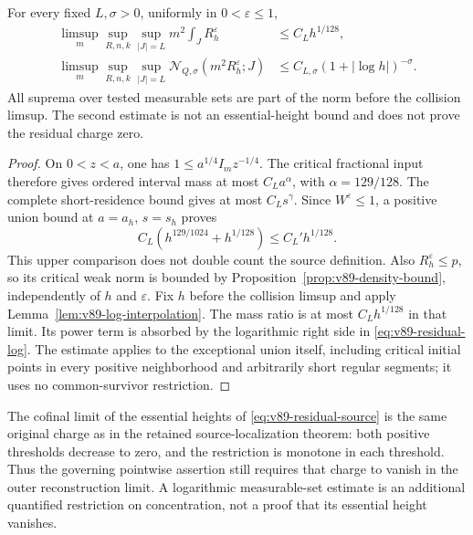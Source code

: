 \begin{theorem}
\label{thm:v89-exceptional-log}
For every fixed $L,\sigma>0$, uniformly in $0<\varepsilon\le1$,
\begin{align}
 \limsup_m\sup_{R,n,k}\sup_{|J|=L}
        m^2\int_J R_h^\varepsilon&\le C_Lh^{1/128},
                                    \label{eq:v89-residual-mass}\\
 \limsup_m\sup_{R,n,k}\sup_{|J|=L}
   \mathcal N_{Q,\sigma}(m^2R_h^\varepsilon;J)
                   &\le C_{L,\sigma}(1+|\log h|)^{-\sigma}.
                                    \label{eq:v89-residual-log}
\end{align}
All suprema over tested measurable sets are part of the norm before
the collision limsup. The second estimate is not an essential-height
bound and does not prove the residual charge zero.
\end{theorem}
\begin{proof}
On $0<z<a$, one has
$1\le a^{1/4}I_m z^{-1/4}$. The critical fractional input therefore
gives ordered interval mass at most $C_La^\alpha$, with
$\alpha=129/128$. The complete short-residence bound gives at most
$C_Ls^\gamma$. Since $W^\varepsilon\le1$, a positive union bound
at $a=a_h$, $s=s_h$ proves
\[
 C_L(h^{129/1024}+h^{1/128})\le C_L' h^{1/128}.
\]
This upper comparison does not double count the source definition.
Also $R_h^\varepsilon\le p$, so its critical weak norm is bounded
by Proposition~\ref{prop:v89-density-bound}, independently of $h$
and $\varepsilon$. Fix $h$ before the collision limsup and apply
Lemma~\ref{lem:v89-log-interpolation}. The mass ratio is at most
$C_Lh^{1/128}$ in that limit. Its power term is absorbed by the
logarithmic right side in \eqref{eq:v89-residual-log}.
The estimate applies to the exceptional union itself, including
critical initial points in every positive neighborhood and arbitrarily
short regular segments; it uses no common-survivor restriction.
\end{proof}

The cofinal limit of the essential heights of
\eqref{eq:v89-residual-source} is the same original charge as in
the retained source-localization theorem: both positive thresholds
decrease to zero, and the restriction is monotone in each threshold.
Thus the governing pointwise assertion still requires that charge to
vanish in the outer reconstruction limit. A logarithmic measurable-set
estimate is an additional quantified restriction on concentration,
not a proof that its essential height vanishes.
